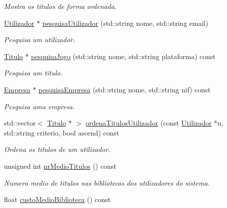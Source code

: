 \begin{DoxyCompactItemize}
\begin{DoxyCompactList}\small\item\em Mostra os titulos de forma ordenada. \end{DoxyCompactList}\item 
\mbox{\hyperlink{class_utilizador}{Utilizador}} $\ast$ \mbox{\hyperlink{class_sistema_a6f2d2d67cb8464771272e60511045032}{pesquisa\+Utilizador}} (std\+::string nome, std\+::string email)
\begin{DoxyCompactList}\small\item\em Pesquisa um utilizador. \end{DoxyCompactList}\item 
\mbox{\hyperlink{class_titulo}{Titulo}} $\ast$ \mbox{\hyperlink{class_sistema_a0fb81a4685bb24024295c89d22d6d719}{pesquisa\+Jogo}} (std\+::string nome, std\+::string plataforma) const
\begin{DoxyCompactList}\small\item\em Pesquisa um titulo. \end{DoxyCompactList}\item 
\mbox{\hyperlink{class_empresa}{Empresa}} $\ast$ \mbox{\hyperlink{class_sistema_a1f22677c42afd48be088f2eca428dede}{pesquisa\+Empresa}} (std\+::string nome, std\+::string nif) const
\begin{DoxyCompactList}\small\item\em Pesquisa uma empresa. \end{DoxyCompactList}\item 
std\+::vector$<$ \mbox{\hyperlink{class_titulo}{Titulo}} $\ast$ $>$ \mbox{\hyperlink{class_sistema_aade841c0c281c63fe922834e228049cd}{ordena\+Titulos\+Utilizador}} (const \mbox{\hyperlink{class_utilizador}{Utilizador}} $\ast$u, std\+::string criterio, bool ascend) const
\begin{DoxyCompactList}\small\item\em Ordena os titulos de um utilizador. \end{DoxyCompactList}\item 
unsigned int \mbox{\hyperlink{class_sistema_a588450a81753c22b0454580fde17a7a7}{nr\+Medio\+Titulos}} () const
\begin{DoxyCompactList}\small\item\em Numero medio de titulos nas bibliotecas dos utilizadores do sistema. \end{DoxyCompactList}\item 
float \mbox{\hyperlink{class_sistema_ab5d9cff098cf2551f1c31d2ba720fb3c}{custo\+Medio\+Biblioteca}} () const

\end{DoxyCompactItemize}
